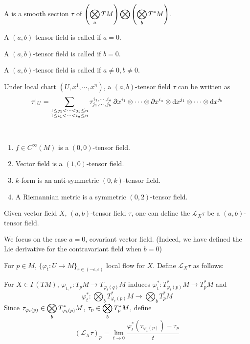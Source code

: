 A   is a smooth section  $ \tau  $ of  $ \displaystyle\left(\displaystyle\bigotimes_a TM\right)\bigotimes \left(\displaystyle\bigotimes_b T^*M\right)$.

A  $ (a,b) $-tensor field is called  if  $ a=0 $.

A  $ (a,b) $-tensor field is called  if  $ b=0 $.

A  $ (a,b) $-tensor field is called  if  $ a\neq 0,b\neq 0$.

Under local chart  $ (U,x^1,\cdots,x^n) $,  a $ (a,b) $-tensor field  $ \tau  $ can be written as 
\begin{equation}\label{eq:tensor field in local chart}
    \tau|_U=\displaystyle\sum_{\substack{1 \leq j_1<\cdots<j_b \leq n\\1 \leq i_1<\cdots<i_a \leq n}} \tau_{j_1,\cdots,j_b}^{i_1,\cdots,i_a}\,\partial x^{i_1}\otimes\cdots\otimes \partial x^{i_a}\otimes \mathrm{d} x^{j_1}\otimes\cdots\otimes\mathrm{d} x^{j_b}
\end{equation} 

\begin{example}
    \,\begin{enumerate}[label=(\arabic*)]
        \item $ f \in C^{\infty}(M)  $ is a  $ (0,0) $-tensor field. 
        \item Vector field is a  $ (1,0 ) $-tensor field.
        \item  $ k  $-form is an anti-symmetric  $ (0,k) $-tensor field.
        \item A Riemannian metric is a symmetric  $ (0,2) $-tensor field.  
    \end{enumerate}
\end{example}
Given vector field  $ X  $,  $ (a,b) $-tensor field  $ \tau $, one can define the  $ \mathcal{L}_X\tau $ be a  $ (a,b) $-tensor field.  

We focus on the case  $ a=0 $, \ie covariant vector field. (Indeed, we have defined the Lie derivative for the contravariant field when  $ b=0 $)

For  $ p\in M $,  $ \{\varphi_t:U\rightarrow M\}_{r\in(-\epsilon,\epsilon)} $ local flow for  $ X  $. Define  $ \mathcal{L}_X\tau $ as follows:

For  $ X\in\Gamma(TM) $,  $ \varphi_{t,*}:T_pM\rightarrow T_{\varphi_t(q)}M $ induces  $ \varphi_t^*:T_{\varphi_t(p)}^*M\rightarrow T_p^*M $ and 
\[\varphi_t^*:\bigotimes_{b}T^*_{\varphi_t(p)}M\rightarrow \bigotimes_{b}T^*_{p}M\]
Since  $ \tau_{\varphi_t(p)}\in\displaystyle\bigotimes_{b}T^*_{\varphi_t(p)}M $,  $ \tau_p\in\displaystyle\bigotimes_{b}T^*_{p}M  $, define 
\begin{equation}
    \left(\mathcal{L}_X\tau\right)_p=\lim_{t\to 0}\frac{\varphi_t^*(\tau_{\varphi_t(p)})-\tau_p}{t}
\end{equation}   

